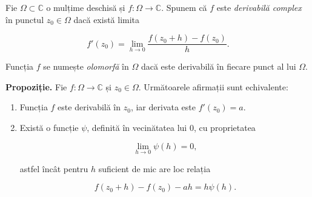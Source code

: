 \begin{definition}
Fie $\Omega \subset \mathbb{C}$ o mulțime deschisă și $f:\Omega \to \mathbb{C}$. 
Spunem că $f$ este \emph{derivabilă complex} în punctul $z_0 \in \Omega$ dacă există limita


\[
f'(z_0) = \lim_{h \to 0} \frac{f(z_0 + h) - f(z_0)}{h}.
\]


Funcția $f$ se numește \emph{olomorfă} în $\Omega$ dacă este derivabilă în fiecare punct al lui $\Omega$.
\end{definition}

\noindent
\textbf{Propoziție.}
Fie $f:\Omega \to \mathbb{C}$ și $z_0 \in \Omega$. Următoarele afirmații sunt echivalente:
\begin{enumerate}
    \item[(i)] Funcția $f$ este derivabilă în $z_0$, iar derivata este $f'(z_0)=a$.
    \item[(ii)] Există o funcție $\psi$, definită în vecinătatea lui $0$, cu proprietatea
    

\[
    \lim_{h \to 0} \psi(h) = 0,
    \]


    astfel încât pentru $h$ suficient de mic are loc relația
    

\[
    f(z_0 + h) - f(z_0) - a h = h \psi(h).
    \]


\end{enumerate}
